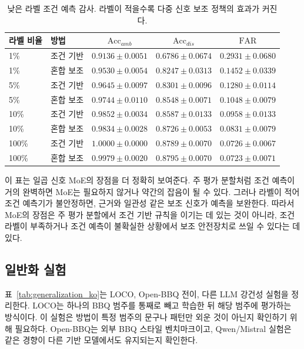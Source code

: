 \documentclass{ieeeaccess}
\newcommand{\accamb}{\mathrm{Acc}_{amb}}
\newcommand{\accdis}{\mathrm{Acc}_{dis}}
\newcommand{\far}{\mathrm{FAR}}
\begin{document}
\begin{table}[t]
\caption{낮은 라벨 조건 예측 감사. 라벨이 적을수록 다중 신호 보조 정책의 효과가 커진다.}
\label{tab:lowlabel_ko}
\centering
\footnotesize
\setlength{\tabcolsep}{6pt}
\begin{tabular}{@{}llccc@{}}
\toprule
라벨 비율 & 방법 & $\accamb$ & $\accdis$ & $\far$ \\
\midrule
1\% & 조건 기반 & $0.9136\pm0.0051$ & $0.6786\pm0.0674$ & $0.2931\pm0.0680$ \\
1\% & 혼합 보조 & $0.9530\pm0.0054$ & $0.8247\pm0.0313$ & $0.1452\pm0.0339$ \\
5\% & 조건 기반 & $0.9645\pm0.0097$ & $0.8301\pm0.0096$ & $0.1280\pm0.0114$ \\
5\% & 혼합 보조 & $0.9744\pm0.0110$ & $0.8548\pm0.0071$ & $0.1048\pm0.0079$ \\
10\% & 조건 기반 & $0.9852\pm0.0034$ & $0.8587\pm0.0133$ & $0.0958\pm0.0133$ \\
10\% & 혼합 보조 & $0.9834\pm0.0028$ & $0.8726\pm0.0053$ & $0.0831\pm0.0079$ \\
100\% & 조건 기반 & $1.0000\pm0.0000$ & $0.8789\pm0.0070$ & $0.0726\pm0.0067$ \\
100\% & 혼합 보조 & $0.9979\pm0.0020$ & $0.8795\pm0.0070$ & $0.0723\pm0.0071$ \\
\bottomrule
\end{tabular}
\end{table}

이 표는 일곱 신호 MoE의 장점을 더 정확히 보여준다. 주 평가 분할처럼 조건 예측이 거의 완벽하면 MoE는 필요하지 않거나 약간의 잡음이 될 수 있다. 그러나 라벨이 적어 조건 예측기가 불안정하면, 근거와 일관성 같은 보조 신호가 예측을 보완한다. 따라서 MoE의 장점은 주 평가 분할에서 조건 기반 규칙을 이기는 데 있는 것이 아니라, 조건 라벨이 부족하거나 조건 예측이 불확실한 상황에서 보조 안전장치로 쓰일 수 있다는 데 있다.

\subsection{일반화 실험}
표~\ref{tab:generalization_ko}는 LOCO, Open-BBQ 전이, 다른 LLM 강건성 실험을 정리한다. LOCO는 하나의 BBQ 범주를 통째로 빼고 학습한 뒤 해당 범주에 평가하는 방식이다. 이 실험은 방법이 특정 범주의 문구나 패턴만 외운 것이 아닌지 확인하기 위해 필요하다. Open-BBQ는 외부 BBQ 스타일 벤치마크이고, Qwen/Mistral 실험은 같은 경향이 다른 기반 모델에서도 유지되는지 확인한다.
\end{document}
